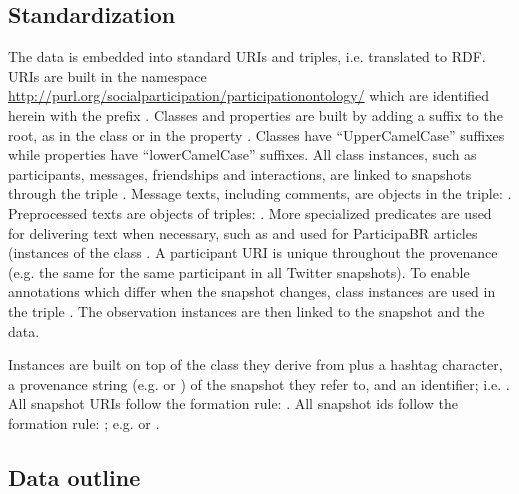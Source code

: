 \subsection{Standardization}
The data is embedded into standard URIs and triples, i.e. translated to RDF.
URIs are built in the namespace \url{http://purl.org/socialparticipation/participationontology/}
which are identified herein with the prefix .
Classes and properties are built by adding a suffix to the root,
as in the class  or in the property .
Classes have ``UpperCamelCase'' suffixes while properties have ``lowerCamelCase'' suffixes.
All class instances, such as participants, messages, friendships and
interactions, are linked to
snapshots through the triple .
Message texts, including comments, are objects in the triple: .
Preprocessed texts are objects of triples: .
More specialized predicates are used for delivering text when necessary,
such as  and  used
for ParticipaBR articles (instances of the class .
A participant URI is unique throughout the provenance (e.g. the same for
the same participant in all Twitter snapshots).
To enable annotations which differ when the snapshot changes,
 class instances are used in the triple
.
The observation instances are then linked to the snapshot and the
data.



Instances are built on top of the class they derive from plus a hashtag character,
a provenance string (e.g.  or
) of the snapshot they refer to, and an identifier;
i.e. .
All snapshot URIs follow the formation rule: .
All snapshot ids follow the formation rule: ; e.g.
 or
.
\subsection{Data outline}


